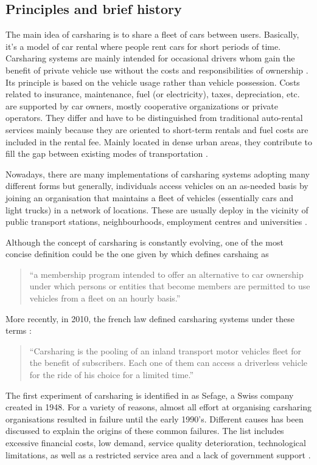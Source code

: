 \subsection{Principles and brief history}
The main idea of carsharing is to share a fleet of cars between users.
Basically, it's a model of car rental where people rent cars for short periods of time.
Carsharing systems are mainly intended for occasional drivers whom gain the benefit of private vehicle use without the costs and responsibilities of ownership \cite{shaheen_carsharing_1998}.
Its principle is based on the vehicle usage rather than vehicle possession.
Costs related to insurance, maintenance, fuel (or electricity), taxes, depreciation, etc. are supported by car owners, \ie mostly cooperative organizations or private operators.
They differ and have to be distinguished from traditional auto-rental services mainly because they are oriented to short-term rentals and fuel costs are included in the rental fee.
Mainly located in dense urban areas, they contribute to fill the gap between existing modes of transportation \cite{louvet_enquete_2013}.

\medskip
Nowadays, there are many implementations of carsharing systems adopting many different forms but generally, individuals access vehicles on an as-needed basis by joining an organisation that maintains a fleet of vehicles (essentially cars and light trucks) in a network of locations.
These are usually deploy in the vicinity of public transport stations, neighbourhoods, employment centres and universities \cite{shaheen_carsharing_1998}.

\bigskip
Although the concept of carsharing is constantly evolving, one of the most concise definition could be the one given by \cite{millard_ball_car_sharing_2005} which defines carshaing as
\begin{quote}
``a membership program intended to offer an alternative to car ownership under which persons or entities that become members are permitted to use vehicles from a fleet on an hourly basis.''
\end{quote}
More recently, in 2010, the french law defined carsharing systems under these terms :
\begin{quote}
``Carsharing is the pooling of an inland transport motor vehicles fleet for the benefit of subscribers. Each one of them can access a driverless vehicle for the ride of his choice for a limited time.'' \cite{cs_loi_2010}
\end{quote}

\bigskip
The first experiment of carsharing is identified in \cite{shaheen_short_1999} as Sefage, a Swiss company created in 1948.
For a variety of reasons, almost all effort at organising carsharing organisations resulted in failure until the early 1990's.
Different causes has been discussed to explain the origins of these common failures.
The list includes excessive financial costs, low demand, service quality deterioration, technological limitations, as well as a restricted service area and a lack of government support \cite{harms_emergence_1998, cousins_theory_2000}.

